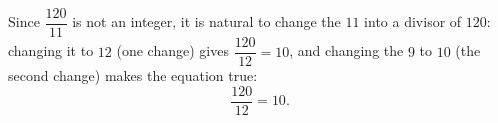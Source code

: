 Since $\dfrac{120}{11}$ is not an integer, it is natural to change the $11$ into a divisor of $120$: changing it to $12$ (one change) gives $\dfrac{120}{12}=10$, and changing the $9$ to $10$ (the second change) makes the equation true:
\[\boxed{\dfrac{120}{12}=10}.\]
